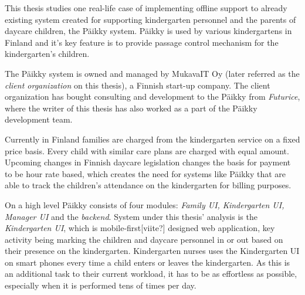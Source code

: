 



This thesis studies one real-life case of implementing offline support to already existing system created for supporting kindergarten personnel and the parents of daycare children, the Päikky system. Päikky is used by various kindergartens in Finland and it's key feature is to provide passage control mechanism for the kindergarten's children.

The Päikky system is owned and managed by MukavaIT Oy (later referred as the \textit{client organization} on this thesis), a Finnish start-up company. The client organization has bought consulting and development to the Päikky from \textit{Futurice}, where the writer of this thesis has also worked as a part of the Päikky development team.


Currently in Finland families are charged from the kindergarten service on a fixed price basis. Every child with similar care plans are charged with equal amount. Upcoming changes in Finnish daycare legislation changes the basis for payment to be hour rate based, which creates the need for systems like Päikky that are able to track the children's attendance on the kindergarten for billing purposes. %

On a high level Päikky consists of four modules: \textit{Family UI, Kindergarten UI, Manager UI} and the \textit{backend}. System under this thesis' analysis is the \textit{Kindergarten UI}, which is mobile-first[viite?] designed web application, key activity being marking the children and daycare personnel in or out based on their presence on the kindergarten. Kindergarten nurses uses the Kindergarten UI on smart phones every time a child enters or leaves the kindergarten. As this is an additional task to their current workload, it has to be as effortless as possible, especially when it is performed tens of times per day.

